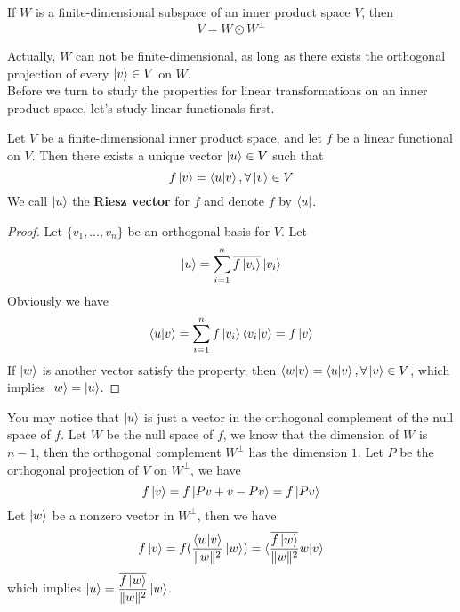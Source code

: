 \documentclass{article}
\begin{document}
\begin{thm}
	If $W$ is a finite-dimensional subspace of an inner product space $V$, then
	\[V=W\odot W^\bot\]
\end{thm}
Actually, $W$ can not be finite-dimensional, as long as there exists the orthogonal projection of every $\ket{v}\in V$ on $W$.\\
\indent Before we turn to study the properties for linear transformations on an inner product space, let's study linear functionals first.
\begin{thm}
	Let $V$ be a finite-dimensional inner product space, and let $f$ be a linear functional on $V$. Then there exists a unique vector $\ket{u}\in V$ such that
	\[f\ket{v}=\braket{u|v},\forall \ket{v}\in V\]
	We call $\ket{u}$ the \textbf{Riesz vector} for $f$ and denote $f$ by $\bra{u}$.
\end{thm}
\begin{proof}
	Let $\{v_1,\dots,v_n\}$ be an orthogonal basis for $V$. Let
	\[\ket{u}=\sum_{i=1}^n\overline{f\ket{v_i}}\ket{v_i}\]
	Obviously we have
	\[\braket{u|v}=\sum_{i=1}^nf\ket{v_i}\braket{v_i|v}=f\ket{v}\]
	If $\ket{w}$ is another vector satisfy the property, then $\braket{w|v}=\braket{u|v},\forall \ket{v}\in V$, which implies $\ket{w}=\ket{u}$.
\end{proof}
You may notice that $\ket{u}$ is just a vector in the orthogonal complement of the null space of $f$. Let $W$ be the null space of $f$, we know that the dimension of $W$ is $n-1$, then the orthogonal complement $W^\bot$ has the dimension $1$. Let $P$ be the orthogonal projection of $V$ on $W^\bot$, we have
\[f\ket{v}=f\ket{Pv+v-Pv}=f\ket{Pv}\]
Let $\ket{w}$ be a nonzero vector in $W^\bot$, then we have
\[f\ket{v}=f(\frac{\braket{w|v}}{\Vert w\Vert^2}\ket{w})=\braket{\frac{\overline{f\ket{w}}}{\Vert w\Vert^2}w|v}\]
which implies $\ket{u}=\dfrac{\overline{f\ket{w}}}{\Vert w\Vert^2}\ket{w}$.
\end{document}
